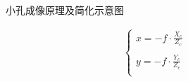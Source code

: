 \documentclass{article}
\begin{document}
\begin{figure}[H]
	\centering  %
	\caption{小孔成像原理及简化示意图}    %
	\label{小孔成像原理及简化示意图}    %
\end{figure}
\begin{gather}
	\left\{ \begin{array}{c}
		x=-f\cdot \frac{X_c}{Z_c}\\
		\\
		y=-f\cdot \frac{Y_c}{Z_c}\\
	\end{array} \right. 	\label{小孔成像模型-公式描述负号}
\end{gather}
\end{document}
